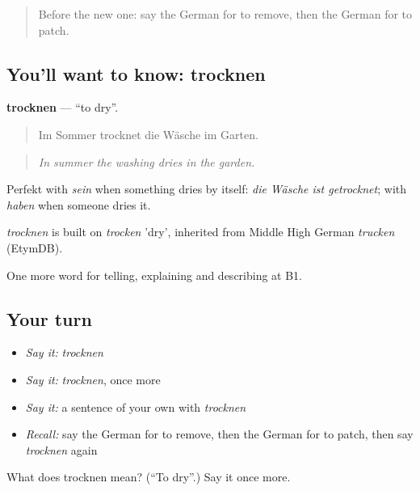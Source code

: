 \label{lesson:GE-C446-trocknen}



\begin{quote}
Before the new one: say the German for to remove, then the German for to patch.
\end{quote}

\subsection*{You'll want to know: trocknen}
\textbf{trocknen} — \textquotedblleft{}to dry\textquotedblright{}.

\begin{quote}
Im Sommer trocknet die Wäsche im Garten.
\end{quote}

\begin{quote}
\emph{In summer the washing dries in the garden.}
\end{quote}

Perfekt with \emph{sein} when something dries by itself: \emph{die Wäsche ist getrocknet}; with \emph{haben} when someone dries it.

\begin{cousinweb}
\emph{trocknen} is built on \emph{trocken} 'dry', inherited from Middle High German \emph{trucken} (EtymDB).
\end{cousinweb}

\begin{grammarlens}[title={What you've built}]
One more word for telling, explaining and describing at B1.
\end{grammarlens}

\subsection*{Your turn}
\begin{itemize}
\raggedright
  \item \emph{Say it:} \emph{trocknen}
  \item \emph{Say it:} \emph{trocknen}, once more
  \item \emph{Say it:} a sentence of your own with \emph{trocknen}
  \item \emph{Recall:} say the German for to remove, then the German for to patch, then say \emph{trocknen} again
\end{itemize}

\begin{tcolorbox}[breakable,colback=teal!4,colframe=teal!35!black,title={Before you move on}]
What does trocknen mean? (\textquotedblleft{}To dry\textquotedblright{}.) Say it once more.
\end{tcolorbox}
